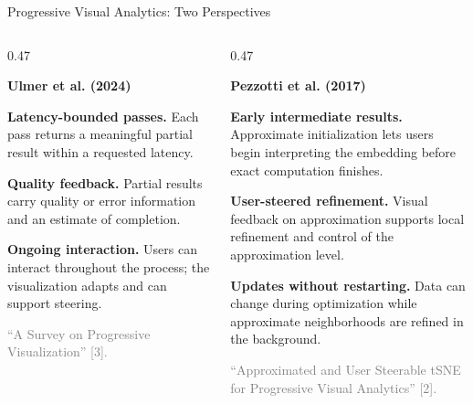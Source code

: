 \documentclass[aspectratio=169]{beamer}
\begin{document}
\begin{frame}{Progressive Visual Analytics: Two Perspectives}
  \begin{columns}[T,onlytextwidth]
    \begin{column}{0.47\textwidth}
      \raggedright
      {\large\bfseries\color{ConferenceBlue}Ulmer et al. (2024)\par}
      \vspace{0.55em}
      {\small
      \textbf{Latency-bounded passes.} Each pass returns a meaningful partial result within a requested latency.\par
      \vspace{0.65em}
      \textbf{Quality feedback.} Partial results carry quality or error information and an estimate of completion.\par
      \vspace{0.65em}
      \textbf{Ongoing interaction.} Users can interact throughout the process; the visualization adapts and can support steering.\par}
      \vfill
      {\scriptsize\textcolor{gray}{``A Survey on Progressive Visualization'' [3].}\par}
    \end{column}
    \begin{column}{0.47\textwidth}
      \raggedright
      {\large\bfseries\color{ConferenceBlue}Pezzotti et al. (2017)\par}
      \vspace{0.55em}
      {\small
      \textbf{Early intermediate results.} Approximate initialization lets users begin interpreting the embedding before exact computation finishes.\par
      \vspace{0.65em}
      \textbf{User-steered refinement.} Visual feedback on approximation supports local refinement and control of the approximation level.\par
      \vspace{0.65em}
      \textbf{Updates without restarting.} Data can change during optimization while approximate neighborhoods are refined in the background.\par}
      \vfill
      {\scriptsize\textcolor{gray}{``Approximated and User Steerable tSNE for Progressive Visual Analytics'' [2].}\par}
    \end{column}
  \end{columns}
\end{frame}
\end{document}
